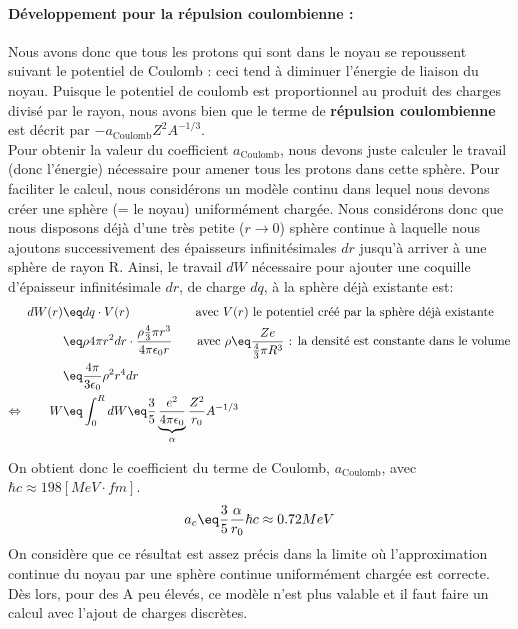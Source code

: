 \paragraph{Développement pour la répulsion coulombienne :}


Nous avons donc que tous les protons qui sont dans le noyau se repoussent suivant le potentiel de Coulomb : ceci tend à diminuer l'énergie de liaison du noyau. Puisque le potentiel de coulomb est proportionnel au produit des charges divisé par le rayon, nous avons bien que le terme de \textbf{répulsion coulombienne} est décrit par $-a_{\text{Coulomb}} Z^2 A^{-1/3}$.\\

Pour obtenir la valeur du coefficient $a_{\text{Coulomb}}$, nous devons juste calculer le travail (donc l'énergie) nécessaire pour amener tous les protons dans cette sphère. Pour faciliter le calcul, nous considérons un modèle continu dans lequel nous devons créer une sphère (= le noyau) uniformément chargée. Nous considérons donc que nous disposons déjà d'une très petite ($r \rightarrow 0$) sphère continue à laquelle nous ajoutons successivement des épaisseurs infinitésimales $dr$ jusqu'à arriver à une sphère de rayon R. Ainsi, le travail $dW$ nécessaire pour ajouter une coquille d'épaisseur infinitésimale $dr$, de charge $dq$, à la sphère déjà existante est:
\begin{align*}
    dW(r) &\eq 
    dq \cdot V(r) \qquad \qquad \quad \;\text{avec $V(r)$ le potentiel créé par la sphère déjà existante}
    \\ 
    &\eq 
    \rho 4\pi r^2 dr \cdot \frac{ \rho \frac{4}{3}\pi r^3}{4\pi\epsilon_0 r}
    \qquad \text{avec } \rho \eq \frac{Ze}{\frac{4}{3}\pi R^3}\text{ : la densité est constante dans le volume}\\
    &\eq
    \frac{4\pi}{3\epsilon_0}\rho^2 r^4 dr \\
    \Leftrightarrow \qquad W &\eq
    \int_0^R dW \eq \frac{3}{5}\underbrace{\frac{e^2}{4\pi\epsilon_0}}_{\alpha}\frac{Z^2}{r_0}A^{-1/3}
\end{align*}

On obtient donc le coefficient du terme de Coulomb, $a_{\text{Coulomb}}$, avec $\hbar c \approx 198 [MeV\cdot fm]$.
\begin{equation*}
    a_c \eq \frac{3}{5}\frac{\alpha}{r_0} \hbar c \approx 0.72MeV
\end{equation*}
On considère que ce résultat est assez précis dans la limite où l'approximation continue du noyau par une sphère continue uniformément chargée est correcte. Dès lors, pour des A peu élevés, ce modèle n'est plus valable et il faut faire un calcul avec l'ajout de charges discrètes.


